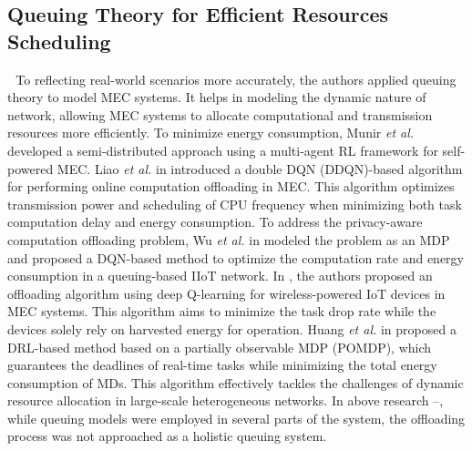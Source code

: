 \documentclass[12pt,draftclsnofoot,onecolumn]{IEEEtran}
\newenvironment{my}[2]%
{\begin{list}{}%
{\setlength{\rightmargin}{#1}\setlength{\leftmargin}{#2}}%


 \item[]{}

} {\end{list}}
\begin{document}
\begin{enumerate}
\begin{my}{1cm}{1cm}
{		\subsection{Queuing Theory for Efficient Resources Scheduling}
		\,\,\,\,To reflecting real-world scenarios more accurately, the authors applied queuing theory to model MEC systems. It helps in modeling the dynamic nature of network, allowing MEC systems to allocate computational and transmission resources more efficiently.
		To minimize energy consumption, Munir \textit{et al.} \cite{munir2021multi} developed a semi-distributed approach using a multi-agent RL framework for self-powered MEC. 
		Liao \textit{et al.} in \cite{liao2023online} introduced a double DQN (DDQN)-based algorithm for performing online computation offloading in MEC. This algorithm optimizes transmission power and scheduling of CPU frequency when minimizing both task computation delay and energy consumption. 
		To address the privacy-aware computation offloading problem, Wu \textit{et al.} in \cite{wu2024combining} modeled the problem as an MDP and proposed a DQN-based method to optimize the computation rate and energy consumption in a queuing-based IIoT network.
		In \cite{Bolourian-WCL24}, the authors proposed an offloading algorithm using deep Q-learning for wireless-powered IoT devices in MEC systems. This algorithm aims to minimize the task drop rate while the devices solely rely on harvested energy for operation. 
		Huang \textit{et al.} in \cite{huang2021deadline} proposed a DRL-based method based on a partially observable MDP (POMDP), which guarantees the deadlines of real-time tasks while minimizing the total energy consumption of MDs. This algorithm effectively tackles the challenges of dynamic resource allocation in large-scale heterogeneous networks.
		In above research \cite{munir2021multi}--\cite{huang2021deadline}, while queuing models were employed in several parts of the system, the offloading process was not approached as a holistic queuing system.
}
\end{my}
\end{enumerate}
\end{document}
